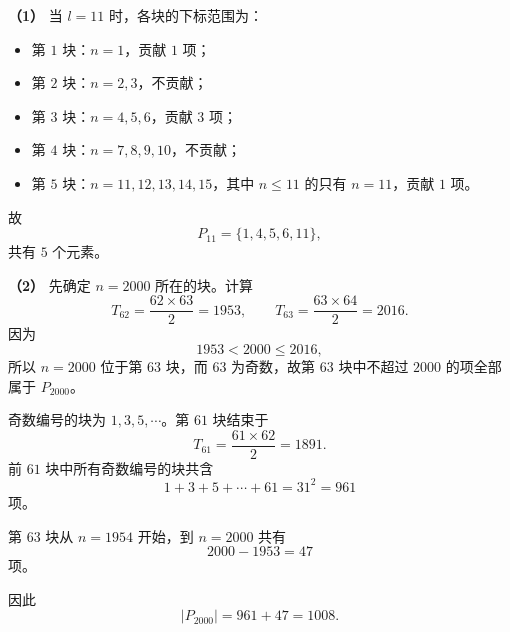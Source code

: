 \begin{answer}
\textbf{（1）} 当 $l=11$ 时，各块的下标范围为：
\begin{itemize}
\item 第 $1$ 块：$n=1$，贡献 $1$ 项；
\item 第 $2$ 块：$n=2,3$，不贡献；
\item 第 $3$ 块：$n=4,5,6$，贡献 $3$ 项；
\item 第 $4$ 块：$n=7,8,9,10$，不贡献；
\item 第 $5$ 块：$n=11,12,13,14,15$，其中 $n\leqslant11$ 的只有 $n=11$，贡献 $1$ 项。
\end{itemize}

故
\nopagebreak[4]
\[P_{11}=\{1,4,5,6,11\},\]
共有 $5$ 个元素。

\textbf{（2）} 先确定 $n=2000$ 所在的块。计算
\nopagebreak[4]
\[T_{62}=\frac{62\times63}{2}=1953,\qquad
T_{63}=\frac{63\times64}{2}=2016.\]
因为
\nopagebreak[4]
\[1953<2000\leqslant2016,\]
所以 $n=2000$ 位于第 $63$ 块，而 $63$ 为奇数，故第 $63$ 块中不超过 $2000$ 的项全部属于 $P_{2000}$。

奇数编号的块为 $1,3,5,\cdots$。第 $61$ 块结束于
\nopagebreak[4]
\[T_{61}=\frac{61\times62}{2}=1891.\]
前 $61$ 块中所有奇数编号的块共含
\nopagebreak[4]
\[1+3+5+\cdots+61=31^2=961\]
项。

第 $63$ 块从 $n=1954$ 开始，到 $n=2000$ 共有
\nopagebreak[4]
\[2000-1953=47\]
项。

因此
\nopagebreak[4]
\[|P_{2000}|=961+47=1008.\]



\end{answer}